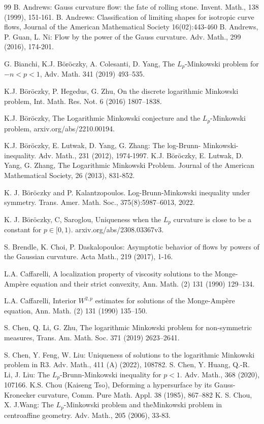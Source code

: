 \documentclass[reqno]{amsart}
\theoremstyle{remark}
\theoremstyle{plain}
\begin{document}
\begin{thebibliography}{99}
 B. Andrews: Gauss curvature flow: the fate of rolling stone. Invent.
Math., 138 (1999), 151-161.
B. Andrews: Classification of limiting shapes for isotropic curve flows, Journal of the American Mathematical Society 16(02):443-460
 B. Andrews, P. Guan, L. Ni: Flow by the power of the Gauss curvature.
Adv. Math., 299 (2016), 174-201.

 G. Bianchi, K.J. B\"or\"oczky, A. Colesanti, D. Yang, The $L_p$-Minkowski problem for $-n<p<1$, Adv. Math. 341 (2019) 493–535.

 K.J. B\"or\"oczky, P. Hegedus, G. Zhu, On the discrete logarithmic Minkowski problem, Int. Math. Res. Not. 6 (2016) 1807–1838.

K.J. B\"or\"oczky, The Logarithmic Minkowski conjecture and the $L_p$-Minkowski problem, arxiv.org/abs/2210.00194. 

K.J. B\"or\"oczky, E. Lutwak, D. Yang, G. Zhang: The log-Brunn-
Minkowski-inequality. Adv. Math., 231 (2012), 1974-1997.
K.J. B\"or\"oczky, E. Lutwak, D. Yang, G. Zhang, The Logarithmic
Minkowski Problem. Journal of the American Mathematical Society, 26 (2013), 831-852. 

K. J. B\"or\"oczky and P. Kalantzopoulos. Log-Brunn-Minkowski inequality under symmetry.
Trans. Amer. Math. Soc., 375(8):5987–6013, 2022.

K. J. B\"or\"oczky, C,  Saroglou, Uniqueness when the $L_p$ curvature is close to be a constant for $p\in [0,1)$. arxiv.org/abs/2308.03367v3.

 S. Brendle, K. Choi, P. Daskalopoulos: Asymptotic behavior of flows
by powers of the Gaussian curvature. Acta Math., 219 (2017), 1-16.

L.A. Caffarelli,  A localization property of viscosity solutions to the Monge-Amp\`ere equation and their strict convexity, Ann. Math. (2) 131 (1990) 129–134.

L.A. Caffarelli, Interior $W^{2,p}$ estimates for solutions of the Monge-Amp\`ere equation, Ann. Math. (2) 131 (1990) 135–150.

 S. Chen, Q. Li, G. Zhu, The logarithmic Minkowski problem for non-symmetric measures, Trans. Am. Math. Soc. 371 (2019) 2623–2641.

S. Chen, Y. Feng, W. Liu: Uniqueness of solutions to the logarithmic Minkowski problem in
R3. Adv. Math., 411 (A) (2022), 108782.
S. Chen, Y. Huang, Q.-R. Li, J. Liu: The $L_p$-Brunn-Minkowski inequality for $p<1$. Adv. Math., 368 (2020), 107166.
 K.S. Chou (Kaiseng Tso), Deforming a hypersurface by its Gauss-Kronecker curvature, Comm. Pure Math. Appl. 38 (1985), 867–882
K. S. Chou, X. J.Wang: The $L_p$-Minkowski problem and theMinkowski problem in centroaffine
geometry. Adv. Math., 205 (2006), 33-83.



\end{thebibliography}
\end{document}
